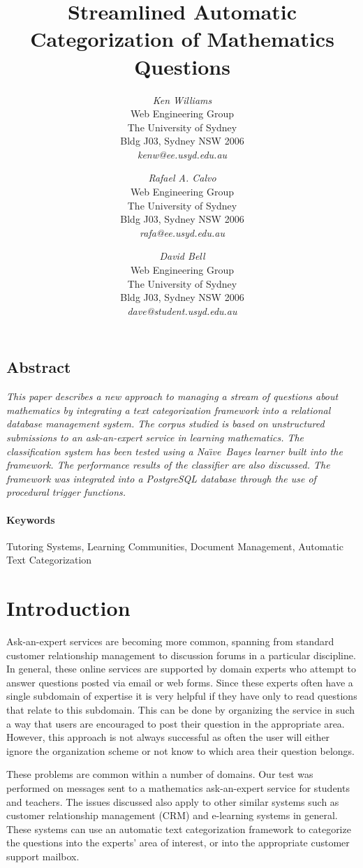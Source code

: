 \documentclass[twocolumn]{article}
\title{Streamlined Automatic Categorization of Mathematics Questions}
\author{
{\em Ken Williams}\\[1ex]
Web Engineering Group\\
The University of Sydney\\
Bldg J03, Sydney NSW 2006\\[1ex]
{\em kenw@ee.usyd.edu.au}
\and
{\em Rafael A. Calvo}\\[1ex]
Web Engineering Group\\
The University of Sydney\\
Bldg J03, Sydney NSW 2006\\[1ex]
{\em rafa@ee.usyd.edu.au}
\and
{\em David Bell}\\[1ex]
Web Engineering Group\\
The University of Sydney\\
Bldg J03, Sydney NSW 2006\\[1ex]
{\em dave@student.usyd.edu.au}
}
\newcommand{\naive}{Na\"\i ve}
\begin{document}
\maketitle
\thispagestyle{empty}


\subsection*{\centering Abstract}
\noindent
{\it 
This paper describes a new approach to managing a stream of questions about 
mathematics by integrating a text categorization framework into a relational database 
management system. The corpus studied is based on unstructured submissions to an 
ask-an-expert service in learning mathematics. The classification system has 
been tested using a \naive\ Bayes learner built into the framework. The 
performance results of the classifier are also discussed. The framework was integrated 
into a PostgreSQL database through the use of procedural trigger functions.
}

\paragraph{Keywords} 
Tutoring Systems, Learning Communities, Document Management, Automatic
Text Categorization



\section{Introduction}

Ask-an-expert services are becoming more common, spanning from standard 
customer relationship management to discussion forums in a particular discipline. In 
general, these online services are supported by domain experts who attempt to answer 
questions posted via email or web forms. Since these experts often have a single subdomain of expertise it is 
very helpful if they have only to read questions that relate to this subdomain. This can be 
done by organizing the service in such a way that users are encouraged to post their 
question in the appropriate area. However, this approach is not always successful as 
often the user will either ignore the organization scheme or not know to which area their 
question belongs. 

These problems are common within a number of domains. Our test was performed on 
messages sent to a mathematics ask-an-expert
service for students and teachers.\cite{drmath} The issues 
discussed also apply to other similar systems such as customer relationship 
management (CRM) and e-learning systems in general. These systems can use an 
automatic text categorization framework to categorize the questions into the experts' 
area of interest, or into the appropriate customer support mailbox. 
\end{document}
